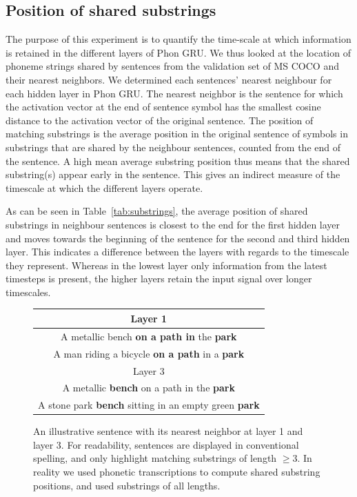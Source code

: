 \subsection{Position of shared substrings}
The purpose of this experiment is to quantify the time-scale at which information is retained in the different layers of {\sc Phon GRU}. We thus looked at the location of phoneme strings shared by sentences from the validation set of MS COCO and their nearest neighbors. We determined each sentences' nearest neighbour for each hidden layer in {\sc Phon GRU}. The nearest neighbor is the sentence for which the activation vector at the end of sentence symbol has the smallest cosine distance to the activation vector of the original sentence. The position of matching substrings is the average position in the original sentence of symbols in substrings that are shared by the neighbour sentences, counted from the end of the sentence. A high mean average substring position thus means that the shared substring(s) appear early in the sentence. This gives an indirect measure of the timescale at which the different layers operate. 

As can be seen in Table~\ref{tab:substrings}, the average position of shared substrings in neighbour sentences is closest to the end for the first hidden layer and moves towards the beginning of the sentence for the second and third hidden layer. This indicates a difference between the layers with regards to the timescale they represent. Whereas in the lowest layer only information from the latest timesteps is present, the higher layers retain the input  signal over longer timescales.


\begin{figure}
  \begin{tabular}{c}
    Layer 1 \\\hline
    A metallic bench {\bf on a path in} the {\bf park} \\
    A man riding a bicycle {\bf on a path} in a {\bf park} \\\hline
    Layer 3 \\\hline
    A metallic {\bf bench} on a path in the {\bf park} \\
    A stone park {\bf bench} sitting in an empty green {\bf park}\\ \hline
  \end{tabular}
  \caption{An illustrative sentence with its nearest neighbor at layer 1 and layer 3. For readability, sentences are displayed in conventional spelling, and only highlight matching substrings of length $\geq3$. In reality we used phonetic transcriptions to compute shared substring positions, and used substrings of all lengths. }
\label{fig:example-shared}
\end{figure}


